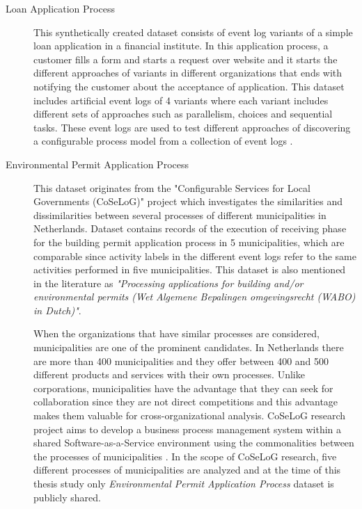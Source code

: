 \begin{description}
  \item[Loan Application Process \cite{loan-app-data}] This synthetically created dataset consists of event log variants of a simple loan application in a financial institute. In this application process, a customer fills a form and starts a request over website and it starts the different approaches of variants in different organizations that ends with notifying the customer about the acceptance of application. This dataset includes artificial event logs of 4 variants where each variant includes different sets of approaches such as parallelism, choices and sequential tasks. These event logs are used to test different approaches of discovering a configurable process model from a collection of event logs \cite{buijs2014flexible}.
  \item[Environmental Permit Application Process \cite{coselog-data}] This dataset originates from the "Configurable Services for Local Governments (CoSeLoG)" project \cite{van2011business} which investigates the similarities and dissimilarities between several processes of different municipalities in Netherlands.  Dataset contains records of the execution of receiving phase for the building permit application process in 5 municipalities, which are comparable since activity labels in the different event logs refer to the same activities performed in five municipalities. This dataset is also mentioned in the literature as \textit{"Processing applications for building and/or environmental permits (Wet Algemene Bepalingen omgevingsrecht (WABO) in Dutch)"}.

  When the organizations that have similar processes are considered, municipalities are one of the prominent candidates. In Netherlands there are more than 400 municipalities and they offer between 400 and 500 different products and services with their own processes. Unlike corporations, municipalities have the advantage that they can seek for collaboration since they are not direct competitions \cite{buijs2012towards} and this advantage makes them valuable for cross-organizational analysis. CoSeLoG research project aims to develop a business process management system within a shared Software-as-a-Service environment using the commonalities between the processes of municipalities \cite{buijs2014flexible}. In the scope of CoSeLoG research, five different processes of municipalities are analyzed and at the time of this thesis study only \textit{Environmental Permit Application Process} dataset is publicly shared.
\end{description}

